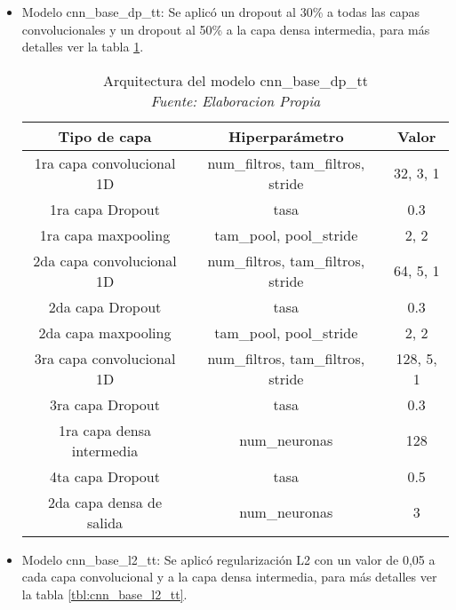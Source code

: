 \begin{itemize}
	
	\item  Modelo cnn\_base\_dp\_tt: Se aplicó un dropout al 30\% a todas las capas convolucionales y un dropout al 50\% a la capa densa intermedia, para más detalles ver la tabla \ref{tbl:cnn_base_dp_tt}.
	
	\begin{table}[!ht]
		\centering
		\begin{tabular}{|c|c|c|}
			\hline
			\textbf{Tipo de capa} & \textbf{Hiperparámetro} & \textbf{Valor} \\ \hline
			1ra capa convolucional 1D & num\_filtros, tam\_filtros, stride & 32, 3, 1 \\ \hline
			1ra capa Dropout & tasa & 0.3 \\ \hline
			1ra capa maxpooling & tam\_pool, pool\_stride & 2, 2 \\ \hline
			2da capa convolucional 1D & num\_filtros, tam\_filtros, stride & 64, 5, 1 \\ \hline
			2da capa Dropout & tasa & 0.3 \\ \hline
			2da capa maxpooling & tam\_pool, pool\_stride & 2, 2 \\ \hline
			3ra capa convolucional 1D & num\_filtros, tam\_filtros, stride & 128, 5, 1 \\ \hline
			3ra capa Dropout & tasa & 0.3 \\ \hline
			1ra capa densa intermedia & num\_neuronas & 128 \\ \hline
			4ta capa Dropout & tasa & 0.5 \\ \hline
			2da capa densa de salida & num\_neuronas & 3 \\ \hline
		\end{tabular}
		\caption[Arquitectura del modelo cnn\_base\_dp\_tt]{Arquitectura del modelo cnn\_base\_dp\_tt
			\\\textit{Fuente: Elaboracion Propia}}
		\label{tbl:cnn_base_dp_tt}
	\end{table}
	
	
	\item  Modelo cnn\_base\_l2\_tt: Se aplicó regularización L2 con un valor de 0,05 a cada capa convolucional y a la capa densa intermedia, para más detalles ver la tabla \ref{tbl:cnn_base_l2_tt}.
	

\end{itemize}
